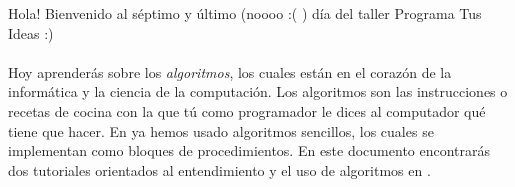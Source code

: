 Hola! Bienvenido al séptimo y último (noooo :( ) día del taller Programa Tus Ideas :)

\paragraph{}
Hoy aprenderás sobre los \emph{algoritmos}, los cuales están en el
corazón de la informática y la ciencia de la computación. Los
algoritmos son las instrucciones o recetas de cocina con la que tú
como programador le dices al computador qué tiene que hacer. En
\AppInventor ya hemos usado algoritmos sencillos, los cuales se
implementan como bloques de procedimientos. En este documento
encontrarás dos tutoriales orientados al entendimiento y el uso de
algoritmos en \AppInventor.